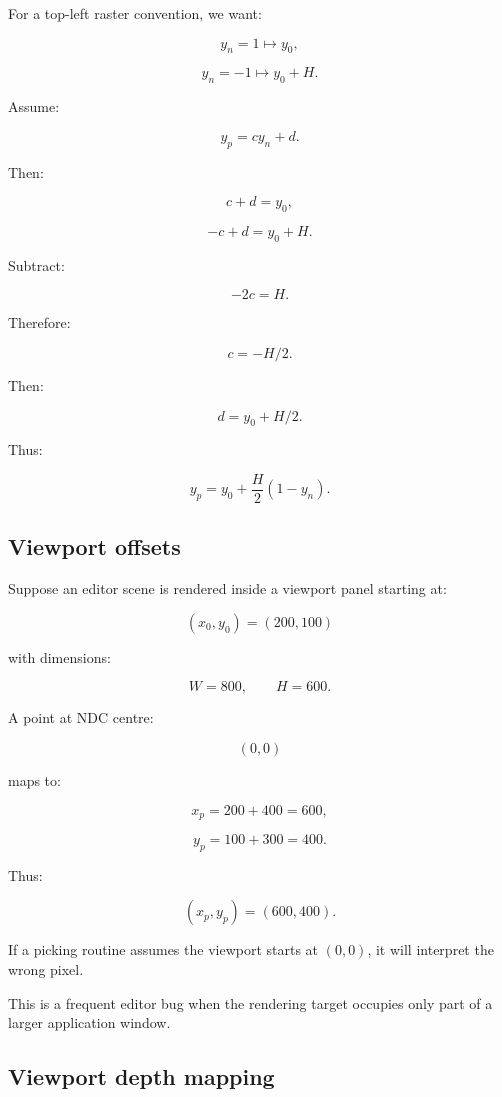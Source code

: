 \hypertarget{02-foundations-ii-ch033-deriving-y-mapping}{}

For a top-left raster convention, we want:

\[
 y_n=1\mapsto y_0,
\]

\[
 y_n=-1\mapsto y_0+H.
\]

Assume:

\[
 y_p=cy_n+d.
\]

Then:

\[
 c+d=y_0,
\]

\[
 -c+d=y_0+H.
\]

Subtract:

\[
 -2c=H.
\]

Therefore:

\[
 c=-H/2.
\]

Then:

\[
 d=y_0+H/2.
\]

Thus:

\[
 \boxed{ y_p=y_0+\frac H2(1-y_n) }.
\]

\subsection{Viewport offsets}\label{02-foundations-ii-ch033-viewport-offsets}

\hypertarget{02-foundations-ii-ch033-viewport-offsets}{}

Suppose an editor scene is rendered inside a viewport panel starting at:

\[
 (x_0,y_0)=(200,100)
\]

with dimensions:

\[
 W=800,\qquad H=600.
\]

A point at NDC centre:

\[
 (0,0)
\]

maps to:

\[
 x_p=200+400=600,
\]

\[
 y_p=100+300=400.
\]

Thus:

\[
 \boxed{(x_p,y_p)=(600,400)}.
\]

If a picking routine assumes the viewport starts at \((0,0)\), it will interpret the wrong pixel.

This is a frequent editor bug when the rendering target occupies only part of a larger application window.

\subsection{Viewport depth mapping}\label{02-foundations-ii-ch033-viewport-depth-mapping}


